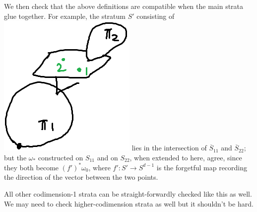 \documentclass[11pt]{article}
\theoremstyle{definition}
\theoremstyle{remark}
\newtheorem{rmk}[thm]{Remark}
\def\ov#1{\overline{#1}}
\begin{document}
We then check that the above definitions are compatible when the main strata glue together. 
For example, the stratum $S'$ consisting of 
\includegraphics[scale=0.4]{S11capS22} lies in the intersection of $\ov{S}_{11}$ and $\ov{S}_{22}$;
but the $\omega_*$ constructed on $S_{11}$ and on $S_{22}$, when extended to here, agree, 
since they both become $(f')^*\omega_0$, where $f':S'\to S^{d-1}$ is the forgetful map recording the direction of the vector between the two points.

All other codimension-1 strata can be straight-forwardly checked like this as well. 
We may need to check higher-codimension strata as well but it shouldn't be hard.

\end{document}
